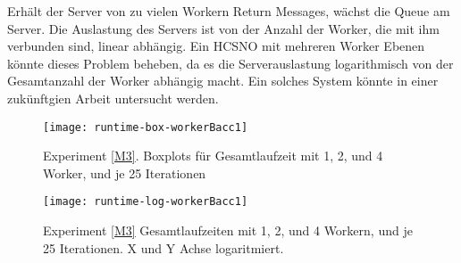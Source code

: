 Erhält der Server von zu vielen Workern Return Messages, wächst die Queue am Server.
Die Auslastung des Servers ist von der Anzahl der Worker, die mit ihm verbunden sind, linear abhängig. Ein HCSNO mit mehreren Worker Ebenen könnte dieses Problem beheben, da es die Serverauslastung logarithmisch von der Gesamtanzahl der Worker abhängig macht. Ein solches System könnte in einer zukünftgien Arbeit untersucht werden.

\vspace{45mm}

\begin{figure}[H]
  \centering
  \begin{minipage}[b]{0.45\textwidth}
    \texttt{[image: runtime-box-workerBacc1]}
    \caption{Experiment \ref{M3}. Boxplots für Gesamtlaufzeit mit 1, 2, und 4 Worker, und je 25 Iterationen}
    \label{runtime-box-workerBacc1}
  \end{minipage}
  \hfill
  \begin{minipage}[b]{0.45\textwidth}
    \texttt{[image: runtime-log-workerBacc1]}
    \caption{Experiment \ref{M3} Gesamtlaufzeiten mit 1, 2, und 4 Workern, und je 25 Iterationen. X und Y Achse logaritmiert.}
    \label{runtime-log-workerBacc1}
  \end{minipage}
\end{figure}
